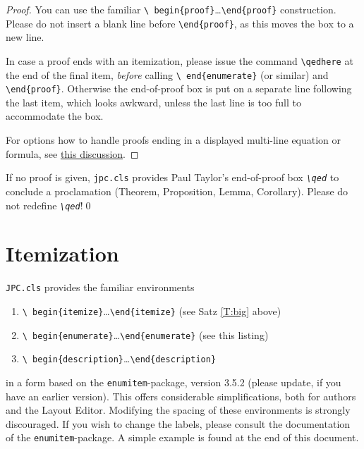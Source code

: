 \documentclass{jpc} %
\theoremstyle{plain}\newtheorem{satz}[thm]{Satz} %
\begin{document}
\begin{proof} You can use the familiar \texttt{\textbackslash
    begin\{proof\}}\dots\texttt{\textbackslash end\{proof\}}
  construction.  Please do not insert a blank line before
  \texttt{\textbackslash end\{proof\}}, as this moves the box to a new
  line.  

  In case a proof ends with an itemization,
  please issue the command \texttt{\textbackslash qedhere} at the end
  of the final item, \emph{before} calling \texttt{\textbackslash
    end\{enumerate\}} (or similar) and \texttt{\textbackslash end\{proof\}}.
  Otherwise the end-of-proof box is put on a separate line
  following the last item, which looks awkward, unless the last line
  is too full to accommodate the box.

  For options how to handle proofs ending in a displayed multi-line
  equation or formula, see
  \href{http://tex.stackexchange.com/questions/101929/qed-or-qedhere-at-the-end-of-split-environment}{this
    discussion}.
\end{proof}

\begin{cor}\label{C:big}
  If no proof is given, \texttt{jpc.cls} provides Paul Taylor's
  end-of-proof box \emph{\texttt{\textbackslash qed}} to conclude a
  proclamation (Theorem, Proposition, Lemma, Corollary).  Please do
  not redefine \emph{\texttt{\textbackslash qed}}!\qed
\end{cor}

\section{Itemization}\label{S:item}
  \texttt{JPC.cls} provides the familiar environments 
\begin{enumerate}
\item\texttt{\textbackslash
  begin\{itemize\}}\dots\texttt{\textbackslash end\{itemize\}} (see
 Satz \ref{T:big} above)
\item\texttt{\textbackslash
  begin\{enumerate\}}\dots\texttt{\textbackslash end\{enumerate\}}
  (see this listing)
\item\texttt{\textbackslash
    begin\{description\}}\dots\texttt{\textbackslash end\{description\}}
\end{enumerate}
  in a form based on the \texttt{enumitem}-package, version 3.5.2
  (please update, if you have an earlier version).  This offers
  considerable simplifications, both for authors and the Layout
  Editor.  Modifying the spacing of these environments is strongly
  discouraged.  If you wish to change the labels, please consult the
  documentation of the \texttt{enumitem}-package.  A simple example is
  found at the end of this document.
\end{document}
